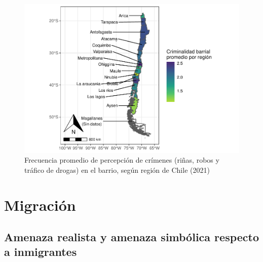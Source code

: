 \documentclass[
  12pt,
]{book}
\begin{document}
\begin{figure}

{\centering \includegraphics{reporte-elsoc_files/figure-latex/confli-region-1} 

}

\caption{Frecuencia promedio de percepción de crímenes (riñas, robos y tráfico de drogas) en el barrio, según región de Chile (2021)}\label{fig:confli-region}
\end{figure}

\hypertarget{migraciuxf3n}{%
\section{Migración}\label{migraciuxf3n}}

\hypertarget{amenaza-realista-y-amenaza-simbuxf3lica-respecto-a-inmigrantes}{%
\subsection{Amenaza realista y amenaza simbólica respecto a inmigrantes}\label{amenaza-realista-y-amenaza-simbuxf3lica-respecto-a-inmigrantes}}
\end{document}

